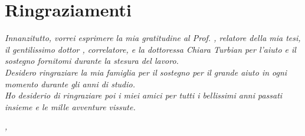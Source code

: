 \cleardoublepage
{}
{}

\begingroup
\let\clearpage\relax
\let\cleardoublepage\relax
\let\cleardoublepage\relax

\chapter*{Ringraziamenti}

\noindent \textit{Innanzitutto, vorrei esprimere la mia gratitudine al Prof. \myProf, relatore della mia tesi, il gentilissimo dottor \myTutor, correlatore, e la dottoressa Chiara Turbian per l'aiuto e il sostegno fornitomi durante la stesura del lavoro.}\\

\noindent \textit{Desidero ringraziare la mia famiglia per il sostegno per il grande aiuto in ogni momento durante gli anni di studio.}\\

\noindent \textit{Ho desiderio di ringraziare poi i miei amici per tutti i bellissimi anni passati insieme e le mille avventure vissute.}\\

\bigskip

\noindent\textit{\myLocation, \myTime}
\hfill \myName

\endgroup

